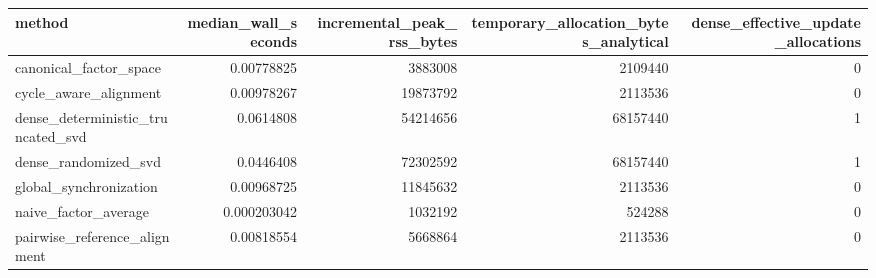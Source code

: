 \begin{tabular}{lrrrr}
\toprule
method & median_wall_seconds & incremental_peak_rss_bytes & temporary_allocation_bytes_analytical & dense_effective_update_allocations \\
\midrule
canonical_factor_space & 0.00778825 & 3883008 & 2109440 & 0 \\
cycle_aware_alignment & 0.00978267 & 19873792 & 2113536 & 0 \\
dense_deterministic_truncated_svd & 0.0614808 & 54214656 & 68157440 & 1 \\
dense_randomized_svd & 0.0446408 & 72302592 & 68157440 & 1 \\
global_synchronization & 0.00968725 & 11845632 & 2113536 & 0 \\
naive_factor_average & 0.000203042 & 1032192 & 524288 & 0 \\
pairwise_reference_alignment & 0.00818554 & 5668864 & 2113536 & 0 \\
\bottomrule
\end{tabular}
